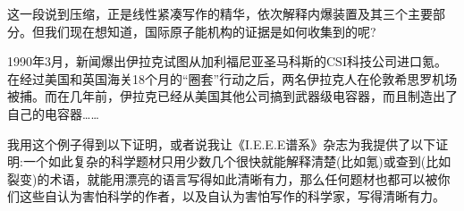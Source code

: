 这一段说到压缩，正是线性紧凑写作的精华，依次解释内爆装置及其三个主要部分。但我们现在想知道，国际原子能机构的证据是如何收集到的呢?

1990年3月，新闻爆出伊拉克试图从加利福尼亚圣马科斯的CSI科技公司进口氪。在经过美国和英国海关18个月的“圈套”行动之后，两名伊拉克人在伦敦希思罗机场被捕。而在几年前，伊拉克已经从美国其他公司搞到武器级电容器，而且制造出了自己的电容器……

我用这个例子得到以下证明，或者说我让《I.E.E.E谱系》杂志为我提供了以下证明:一个如此复杂的科学题材只用少数几个很快就能解释清楚(比如氪)或查到(比如裂变)的术语，就能用漂亮的语言写得如此清晰有力，那么任何题材也都可以被你们这些自认为害怕科学的作者，以及自认为害怕写作的科学家，写得清晰有力。